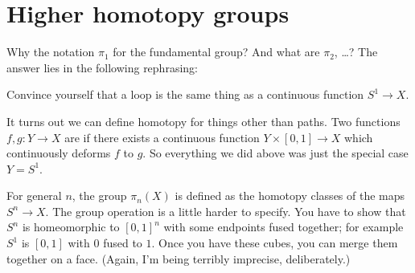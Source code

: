 %

\section{Higher homotopy groups}
\label{sec:higher_homotopy_grps}
Why the notation $\pi_1$ for the fundamental group?
And what are $\pi_2$, \dots?
The answer lies in the following rephrasing:
\begin{ques}
	Convince yourself that a loop is the same thing
	as a continuous function $S^1 \to X$.
\end{ques}
It turns out we can define homotopy for things other than paths.
Two functions $f, g \colon Y \to X$ are  if there exists a continuous
function $Y \times [0,1] \to X$ which continuously deforms $f$ to $g$.
So everything we did above was just the special case $Y = S^1$.

For general $n$, the group $\pi_n(X)$ is defined as the homotopy classes
of the maps $S^n \to X$.
The group operation is a little harder to specify.
You have to show that $S^n$ is homeomorphic to $[0,1]^n$ with
some endpoints fused together; for example $S^1$ is $[0,1]$ with $0$ fused to $1$.
Once you have these cubes, you can merge them together on a face.
(Again, I'm being terribly imprecise, deliberately.)

